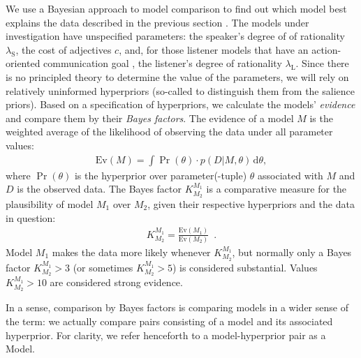 We use a Bayesian approach to model comparison to find out which model
best explains the data described in the previous section
\cite{VandekerckhoveMatzke2013:Model-Compariso}. The models under
investigation have unspecified parameters: the speaker's degree of of
rationality $\lambda_\mathrm{S}$, the cost of adjectives $c$, and, for
those listener models that have an action-oriented communication goal
, the listener's degree of rationality $\lambda_\mathrm{L}$. Since
there is no principled theory to determine the value of the
parameters, we will rely on relatively uninformed hyperpriors
(so-called to distinguish them from the salience priors). Based on a
specification of hyperpriors, we calculate the models' \emph{evidence}
and compare them by their \emph{Bayes factors}. The evidence of a
model $M$ is the weighted average of the likelihood of observing the
data under all parameter values:
\begin{align}
  \label{BMA}
  \mathrm{Ev}(M)= \int \Pr(\theta) \cdot p(D | M, \theta)\, \mathrm{d}\theta,
\end{align}
where $\Pr(\theta)$ is the hyperprior over parameter(-tuple) $\theta$
associated with $M$ and $D$ is the observed data. The Bayes factor
$K^{M_1}_{M_2}$ is a comparative measure for the plausibility of model
$M_1$ over $M_2$, given their respective hyperpriors and the data in
question:
\begin{align}
  K^{M_1}_{M_2} = \frac{\mathrm{Ev}(M_1)}{\mathrm{Ev}(M_2)} \enspace .
\end{align}
Model $M_1$ makes the data more likely whenever $K^{M_1}_{M_2}$, but
normally only a Bayes factor $K^{M_1}_{M_2} >3$ (or sometimes
$K^{M_1}_{M_2} > 5$) is considered substantial. Values $K^{M_1}_{M_2}
> 10$ are considered strong evidence.

In a sense, comparison by Bayes factors is comparing models in a wider
sense of the term: we actually compare pairs consisting of a model and
its associated hyperprior. For clarity, we refer henceforth to a
model-hyperprior pair as a Model.

